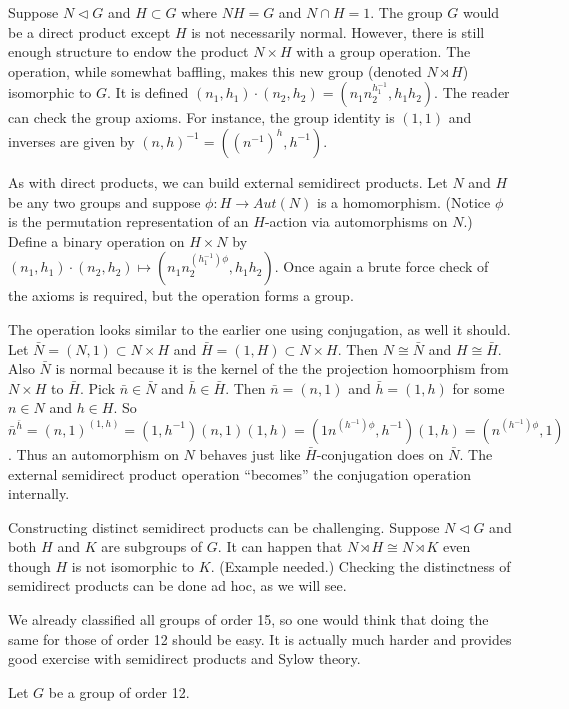 \documentclass[letterpaper]{article}
\begin{document}
Suppose $N \lhd G$ and $H \subset G$ where $NH = G$ and $N \cap H
= 1$. The group $G$ would be a direct product except $H$ is not
necessarily normal. However, there is still enough structure to
endow the product $N \times H$ with a group operation. The operation,
while somewhat baffling, makes this new group (denoted $N \rtimes
H$) isomorphic to $G$. It is defined $(n_1, h_1) \cdot (n_2, h_2)
= (n_1 n_2^{h_1^{-1}}, h_1 h_2)$. The reader can check the group
axioms. For instance, the group identity is $(1, 1)$ and inverses
are given by $(n, h)^{-1} = ((n^{-1})^h, h^{-1})$.

As with direct products, we can build external semidirect products.
Let $N$ and $H$ be any two groups and suppose $\phi \colon H
\rightarrow Aut(N)$ is a homomorphism. (Notice $\phi$ is the
permutation representation of an $H$-action via automorphisms on
$N$.) Define a binary operation on $H \times N$ by $(n_1, h_1) \cdot
(n_2, h_2) \mapsto (n_1n_2^{(h_1^{-1})\phi}, h_1 h_2)$. Once again
a brute force check of the axioms is required, but the operation
forms a group.

The operation looks similar to the earlier one using conjugation,
as well it should. Let $\bar N = (N, 1) \subset N \times H$ and
$\bar H = (1, H) \subset N \times H$. Then $N \cong \bar N$ and $H
\cong \bar H$. Also $\bar N$ is normal because it is the kernel of
the the projection homoorphism from $N \times H$ to $\bar H$. Pick
$\bar n \in \bar N$ and $\bar h \in \bar H$. Then $\bar n = (n, 1)$
and $\bar h = (1, h)$ for some $n \in N$ and $h \in H$. So ${\bar
n}^{\bar h} = (n, 1)^{(1, h)} = (1, h^{-1})(n, 1)(1, h) =
(1n^{(h^{-1})\phi}, h^{-1})(1, h) = (n^{(h^{-1})\phi}, 1)$. Thus
an automorphism on $N$ behaves just like $\bar H$-conjugation does
on $\bar N$. The external semidirect product operation ``becomes''
the conjugation operation internally.

Constructing distinct semidirect products can be challenging. Suppose
$N \lhd G$ and both $H$ and $K$ are subgroups of $G$. It can happen
that $N \rtimes H \cong N \rtimes K$ even though $H$ is not isomorphic
to $K$. (Example needed.) Checking the distinctness of semidirect
products can be done ad hoc, as we will see.

We already classified all groups of order 15, so one would think
that doing the same for those of order 12 should be easy. It is
actually much harder and provides good exercise with semidirect
products and Sylow theory.

Let $G$ be a group of order 12.
\end{document}
